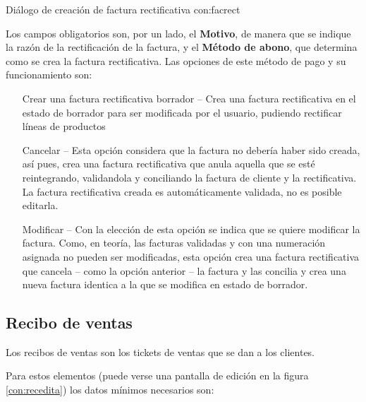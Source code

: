 {Diálogo de creación de factura rectificativa}
{con:facrect}

Los campos obligatorios son, por un lado, el \textbf{Motivo}, de manera que se indique la razón de la rectificación de la factura, y el \textbf{Método de abono}, que determina como se crea la factura rectificativa. Las opciones de este método de pago y su funcionamiento son:

\begin{itemize}
  \item[Crear una factura rectificativa borrador] -- Crea una factura rectificativa en el estado de borrador para ser modificada por el
            usuario, pudiendo rectificar líneas de productos
  \item[Cancelar] -- Esta opción considera que la factura no debería haber sido creada, así pues, crea una factura rectificativa que
            anula aquella que se esté reintegrando, validandola y conciliando la factura de cliente y la rectificativa. La factura 
            rectificativa creada es automáticamente validada, no es posible editarla.
  \item[Modificar] -- Con la elección de esta opción se indica que se quiere modificar la factura. Como, en teoría, las facturas
            validadas y con una numeración asignada no pueden ser modificadas, esta opción crea una factura rectificativa que cancela -- 
            como la opción anterior -- la factura y las concilia y crea una nueva factura identica a la que se modifica en estado 
            de borrador. 
\end{itemize}






\subsection{Recibo de ventas}

Los recibos de ventas son los tickets de ventas que se dan a los clientes. 

Para estos elementos (puede verse una pantalla de edición en la figura \ref{con:recedita}) los datos mínimos necesarios son:

